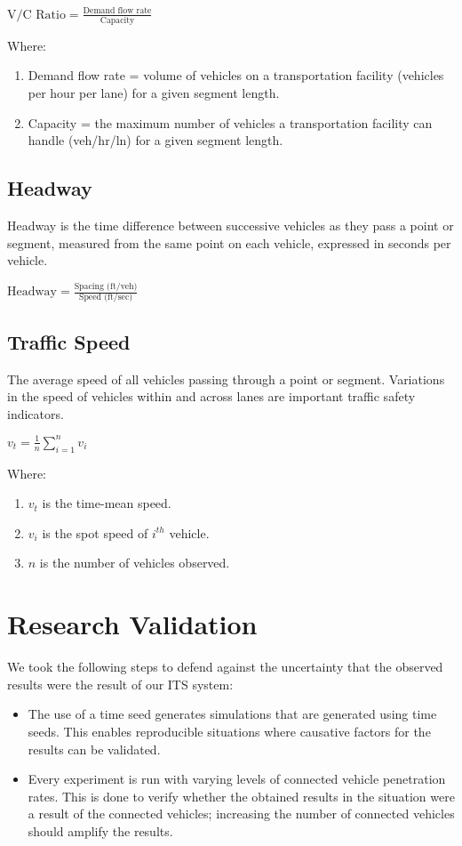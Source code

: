 $\text{V/C Ratio}=\frac{\text{Demand flow rate}}{\text{Capacity}}$

Where:
\begin{enumerate} 
\item Demand flow rate = volume of vehicles on a transportation facility (vehicles per hour per lane) for a given segment length.
\item Capacity = the maximum number of vehicles a transportation facility can handle (veh/hr/ln) for a given segment length.
\end{enumerate}

\subsection{Headway}

Headway is the time difference between successive vehicles as they pass a point or segment, measured from the same point on each vehicle, expressed in seconds per vehicle.

$\text{Headway}=\frac{\text{Spacing (ft/veh)}}{\text{Speed (ft/sec)}}$

\subsection{Traffic Speed}

The average speed of all vehicles passing through a point or segment. Variations in the speed of vehicles within and across lanes are important traffic safety indicators.

$v_t=\frac{1}{n}\sum^{n}_{i=1}{v_i}$

Where:
\begin{enumerate}
\item $v_t$ is the time-mean speed.
\item $v_i$ is the spot speed of $i^{th}$ vehicle.
\item $n$ is the number of vehicles observed.
\end{enumerate}

\section{Research Validation}

We took the following steps to defend against the uncertainty that the observed results were the result of our \acrshort{ITS} system:
\begin{itemize}
\item The use of a time seed generates simulations that are generated using time seeds. This enables reproducible situations where causative factors for the results can be validated.
\item Every experiment is run with varying levels of connected vehicle penetration rates. This is done to verify whether the obtained results in the situation were a result of the connected vehicles; increasing the number of connected vehicles should amplify the results.
\end{itemize}

